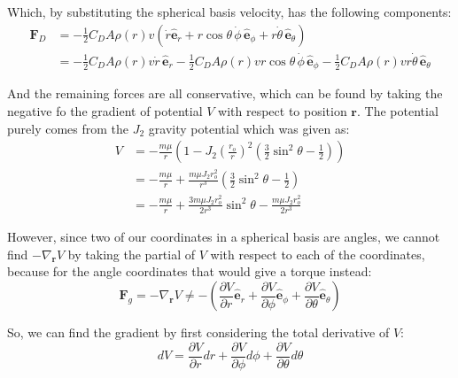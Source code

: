 \documentclass[titlepage]{article}
\begin{document}
Which, by substituting the spherical basis velocity, has the following components:
\begin{equation}
	\begin{split}
		\boldsymbol{F}_D&=-\frac{1}{2}C_DA\rho(r)v\left(\dot{r}\hat{\boldsymbol{e}}_r+r\cos\theta\,\dot{\phi}\,\hat{\boldsymbol{e}}_\phi+r\dot{\theta}\,\hat{\boldsymbol{e}}_\theta\right) \\
		&=-\frac{1}{2}C_DA\rho(r)v\dot{r}\,\hat{\boldsymbol{e}}_r-\frac{1}{2}C_DA\rho(r)vr\cos\theta\,\dot{\phi}\,\hat{\boldsymbol{e}}_\phi-\frac{1}{2}C_DA\rho(r)vr\dot{\theta}\,\hat{\boldsymbol{e}}_\theta
	\end{split}
\end{equation}

And the remaining forces are all conservative, which can be found by taking the negative fo the gradient of potential $V$ with respect to position $\boldsymbol{r}$. The potential purely comes from the $J_2$ gravity potential which was given as:
\begin{equation}
	\begin{split}
		V&=-\frac{m\mu}{r}\left(1-J_2\left(\frac{r_o}{r}\right)^2\left(\frac{3}{2}\sin^2\theta-\frac{1}{2}\right)\right) \\
		&=-\frac{m\mu}{r}+\frac{m\mu J_2r_o^2}{r^3}\left(\frac{3}{2}\sin^2\theta-\frac{1}{2}\right) \\
		&=-\frac{m\mu}{r}+\frac{3m\mu J_2r_o^2}{2r^3}\sin^2\theta-\frac{m\mu J_2r_o^2}{2r^3}
	\end{split}
\end{equation}

However, since two of our coordinates in a spherical basis are angles, we cannot find $-\nabla_{\boldsymbol{r}}V$ by taking the partial of $V$ with respect to each of the coordinates, because for the angle coordinates that would give a torque instead:
\begin{equation}
	\boldsymbol{F}_g=-\nabla_{\boldsymbol{r}}V\neq-\left(\frac{\partial V}{\partial r}\hat{\boldsymbol{e}}_r+\frac{\partial V}{\partial\phi}\hat{\boldsymbol{e}}_\phi+\frac{\partial V}{\partial\theta}\hat{\boldsymbol{e}}_\theta\right)
\end{equation}

So, we can find the gradient by first considering the total derivative of $V$:
\begin{equation}
	dV=\frac{\partial V}{\partial r}dr+\frac{\partial V}{\partial\phi}d\phi+\frac{\partial V}{\partial\theta}d\theta
	\label{eq:totalV1}
\end{equation}
\end{document}

